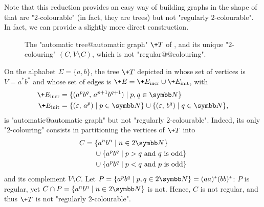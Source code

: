 Note that this reduction provides an easy way of building
graphs in the shape of  that are "2-colourable" (in fact, they are trees) but not "regularly $2$-colourable". In fact, we can provide a slightly more
direct construction.

\begin{figure}
    \centering
    \begin{tikzpicture}
        
    \end{tikzpicture}
    \caption{
        \label{fig:tree-not-2reg-colour}
        The "automatic tree@automatic graph" $\+T$ of ,
        and its unique "$2$-colouring" $(C, V\setminus C)$, which is not "regular@@colouring".
    }
\end{figure}
\begin{example}
    \AP\label{ex:tree-not-2-reg-colourable}
    On the alphabet $\Sigma = \{a,b\}$, the tree $\+T$ depicted in  whose set of vertices is $V = a^*b^*$ and whose set 
    of edges is $\+E = \+E_{\mathrm{incr}} \cup \+E_{\mathrm{init}}$, with 
    \begin{align*}
        \+E_{\mathrm{incr}} & = \{(a^pb^q,\, a^{p+1}b^{q+1}) \mid p,q \in \N\} \\
        \+E_{\mathrm{init}} & = \{(\varepsilon,\, a^p) \mid p \in \N\} \cup \{(\varepsilon,\, b^q) \mid q \in \N\}, 
    \end{align*}    
    is "automatic@automatic graph" but not "regularly $2$-colourable".
    Indeed, its only "$2$-colouring"
    consists in partitioning the vertices of $\+T$ into
    \begin{align*}
        C =\;& \{a^n b^n \mid n \in 2\N\} \\
            & \cup \{a^p b^q \mid p > q \text{ and $q$ is odd}\} \\
            & \cup \{a^p b^q \mid p < q \text{ and $p$ is odd}\}
    \end{align*}
    and its complement $V \setminus C$.
    Let $P = \{a^p b^q \mid p, q \in 2\N\} = (aa)^*(bb)^*$:
    $P$ is regular, yet $C \cap P = \{a^n b^n \mid n \in 2\N\}$ is not.
    Hence, $C$ is not regular, and thus $\+T$ is not "regularly $2$-colourable".
\end{example}